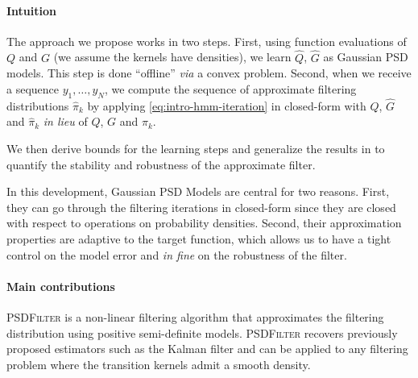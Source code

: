 \paragraph{Intuition}

The approach we propose works in two steps. First, using function evaluations of $Q$ and $G$ (we assume the kernels have densities), we learn $\hat Q$, $\hat G$ as Gaussian PSD models. This step is done ``offline'' \emph{via} a convex problem. Second, when we receive a sequence $y_1, \ldots, y_N$, we compute the sequence of approximate filtering distributions $\hat\pi_k$ by applying \cref{eq:intro-hmm-iteration} in closed-form with $\hat Q$, $\hat G$ and $\hat \pi_k$ \emph{in lieu} of $Q$, $G$ and $\pi_k$.

We then derive bounds for the learning steps and generalize the results in \cite{oudjane} to quantify the stability and robustness of the approximate filter.

In this development, Gaussian PSD Models are central for two reasons. First, they can go through the filtering iterations in closed-form since they are closed with respect to operations on probability densities. Second, their approximation properties are adaptive to the target function, which allows us to have a tight control on the model error and \emph{in fine} on the robustness of the filter.

\paragraph{Main contributions}
\textsc{PSDFilter} is a non-linear filtering algorithm that approximates the filtering distribution using positive semi-definite models. \textsc{PSDFilter} recovers previously proposed estimators such as the Kalman filter and can be applied to any filtering problem where the transition kernels admit a smooth density.


